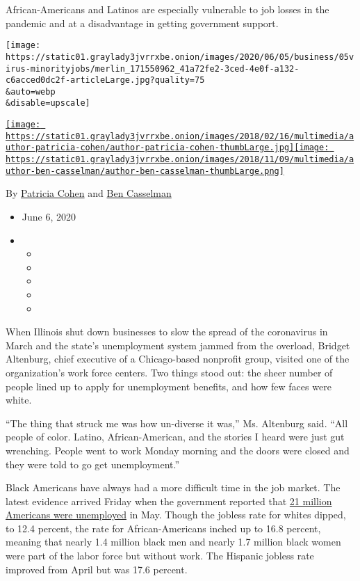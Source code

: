 African-Americans and Latinos are especially vulnerable to job losses in
the pandemic and at a disadvantage in getting government support.

\texttt{[image: https://static01.graylady3jvrrxbe.onion/images/2020/06/05/business/05virus-minorityjobs/merlin\_171550962\_41a72fe2-3ced-4e0f-a132-c6acced0dc2f-articleLarge.jpg?quality=75\\\&auto=webp\\\&disable=upscale]}

\href{https://www.nytimes3xbfgragh.onion/by/patricia-cohen}{\texttt{[image: https://static01.graylady3jvrrxbe.onion/images/2018/02/16/multimedia/author-patricia-cohen/author-patricia-cohen-thumbLarge.jpg]}}\href{https://www.nytimes3xbfgragh.onion/by/ben-casselman}{\texttt{[image: https://static01.graylady3jvrrxbe.onion/images/2018/11/09/multimedia/author-ben-casselman/author-ben-casselman-thumbLarge.png]}}

By \href{https://www.nytimes3xbfgragh.onion/by/patricia-cohen}{Patricia
Cohen} and
\href{https://www.nytimes3xbfgragh.onion/by/ben-casselman}{Ben
Casselman}

\begin{itemize}
\item
  June 6, 2020
\item
  \begin{itemize}
  \item
  \item
  \item
  \item
  \item
  \end{itemize}
\end{itemize}

When Illinois shut down businesses to slow the spread of the coronavirus
in March and the state's unemployment system jammed from the overload,
Bridget Altenburg, chief executive of a Chicago-based nonprofit group,
visited one of the organization's work force centers. Two things stood
out: the sheer number of people lined up to apply for unemployment
benefits, and how few faces were white.

``The thing that struck me was how un-diverse it was,'' Ms. Altenburg
said. ``All people of color. Latino, African-American, and the stories I
heard were just gut wrenching. People went to work Monday morning and
the doors were closed and they were told to go get unemployment.''

Black Americans have always had a more difficult time in the job market.
The latest evidence arrived Friday when the government reported that
\href{https://www.nytimes3xbfgragh.onion/2020/06/05/business/economy/jobs-report.html}{21
million Americans were unemployed} in May. Though the jobless rate for
whites dipped, to 12.4 percent, the rate for African-Americans inched up
to 16.8 percent, meaning that nearly 1.4 million black men and nearly
1.7 million black women were part of the labor force but without work.
The Hispanic jobless rate improved from April but was 17.6 percent.


